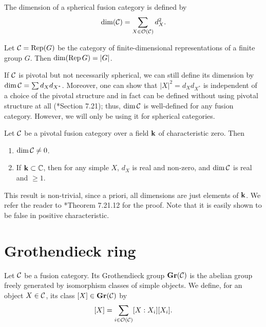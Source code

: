\begin{definition}
  The dimension of a spherical fusion category is defined by
  $$
    \dim(\mathcal{C})=\sum_{X\in \mathcal{O}(\mathcal{C})} d_X^2.
  $$
\end{definition}

\begin{example}\label{x:dim-repg}
  Let $\mathcal{C}=\operatorname{Rep}(G)$ be the category of finite-dimensional representations of
  a finite group $G$. Then $\dim (\operatorname{Rep} G)=|G|$.
\end{example}

\begin{remark}
  If $\mathcal{C}$ is pivotal but not necessarily spherical, we can still define its
  dimension by $\dim \mathcal{C}=\sum d_X d_{X^*}$. Moreover, one can show that
  $|X|^2=d_X d_{X^*}$ is independent of a choice of the pivotal structure and in
  fact can be defined without using pivotal structure at all
  (*{Section 7.21}); thus, $\dim \mathcal{C}$ is well-defined
  for any fusion category. However, we will only be using it for spherical
  categories.
\end{remark}

\begin{theorem}\label{t:dim-nonzero}
  Let $\mathcal{C}$ be a pivotal fusion category over a field $\mathbf{k}$ of
  characteristic zero. Then
  \begin{enumerate}
    \item $\dim \mathcal{C}\ne 0$.
    \item If $\mathbf{k}\subset\mathbb{C}$, then for any simple $X$,
  $d_X$ is real and non-zero, and $\dim \mathcal{C}$ is real and $\ge1$.
  \end{enumerate}
\end{theorem}
This result is non-trivial, since a priori, all dimensions are just elements of
$\mathbf{k}$. We refer the reader to *{Theorem 7.21.12} for the
proof. Note that it is easily shown to be false in positive characteristic.

\section{Grothendieck ring}\label{s:grothendieck-ring}
\begin{definition}\label{d:grothendieck}
  Let $\mathcal{C}$ be a fusion category. Its Grothendieck group $\mathbf{Gr}(\mathcal{C})$ is the
  abelian group freely generated by isomorphism classes of simple objects. We
  define, for an object $X\in \mathcal{C}$, its class $[X]\in \mathbf{Gr}(\mathcal{C})$ by
  $$
    [X]=\sum_{i\in \mathcal{O}(\mathcal{C})} [X:X_i] [X_i].
  $$
\end{definition}

